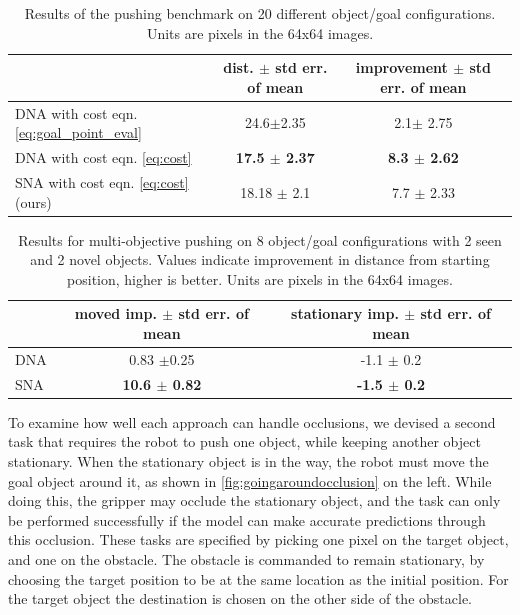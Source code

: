 \begin{table}
{\footnotesize
    \begin{center}
    \begin{tabular}{lcc}
    	\toprule
           &  \thead{dist. \\ $\pm$ std err. of mean} & \thead{improvement \\ $\pm$ std err. of mean}  \\  
           \midrule
      DNA with cost eqn. \ref{eq:goal_point_eval}\cite{foresight}  & 24.6$\pm$2.35 & 2.1$\pm$ 2.75\\
      DNA with cost eqn. \ref{eq:cost}  & \textbf{17.5 $\pm$ 2.37} &  \textbf{8.3 $\pm$ 2.62}\\ 
      SNA with cost eqn. \ref{eq:cost} (ours) & 18.18 $\pm$ 2.1 & 7.7 $\pm$ 2.33\\
      \bottomrule
    \end{tabular}
    \end{center}
    }
    \caption{Results of the pushing benchmark on 20 different object/goal configurations. Units are pixels in the 64x64 images.}
    \label{table:res_dna_sna}
\end{table}


\begin{table}
\centering
{\footnotesize
\begin{tabular}{lcc}
	\toprule
         &  \thead{moved imp. \\ $\pm$ std err. of mean} &   \thead{stationary imp. \\ $\pm$ std err. of mean}  \\
         \midrule
  DNA \cite{foresight} & 0.83 $\pm$0.25 &  -1.1 $\pm$ 0.2\\ 
  SNA & \textbf{10.6 $\pm$ 0.82} & \textbf{-1.5 $\pm$ 0.2} \\
  \bottomrule
\end{tabular}
}

\caption{Results for multi-objective pushing on 8 object/goal configurations with 2 seen and 2 novel objects. Values indicate improvement in distance from starting position, higher is better. Units are pixels in the 64x64 images.} 
\label{table:mult_obj}

\end{table}

To examine how well each approach can handle occlusions, we devised a second task that requires the robot to push one object, while keeping another object stationary. When the stationary object is in the way, the robot must move the goal object around it, as shown in \autoref{fig:goingaroundocclusion} on the left. While doing this, the gripper may occlude the stationary object, and the task can only be performed successfully if the model can make accurate predictions through this occlusion. These tasks are specified by picking one pixel on the target object, and one on the obstacle. The obstacle is commanded to remain stationary, by choosing the target position to be at the same location as the initial position. For the target object the destination is chosen on the other side of the obstacle.

